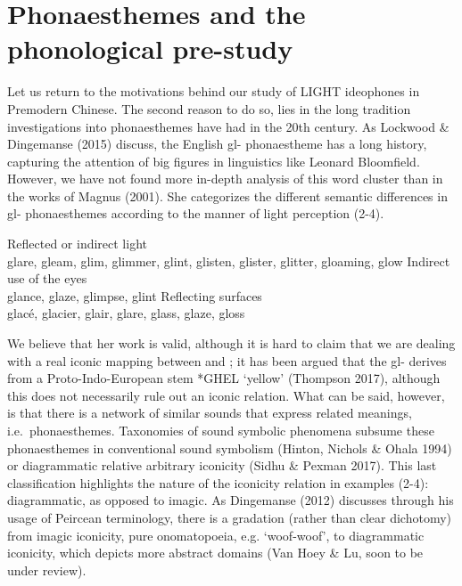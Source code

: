 \documentclass[12pt,article,oneside]{memoir}
\theoremstyle{definition}
\theoremstyle{definition}
\theoremstyle{definition}
\theoremstyle{remark}
\begin{document}
\section{Phonaesthemes and the phonological
pre-study}\label{phonaesthemes-and-the-phonological-pre-study}

Let us return to the motivations behind our study of LIGHT ideophones in
Premodern Chinese. The second reason to do so, lies in the long
tradition investigations into phonaesthemes have had in the 20th
century. As Lockwood \& Dingemanse (2015) discuss, the English gl-
phonaestheme has a long history, capturing the attention of big figures
in linguistics like Leonard Bloomfield. However, we have not found more
in-depth analysis of this word cluster than in the works of Magnus
(2001). She categorizes the different semantic differences in gl-
phonaesthemes according to the manner of light perception (2-4).

\begin{exe}
    \ex \begin{xlist}
        \ex Reflected or indirect light\\
            glare, gleam, glim, glimmer, glint, glisten, glister,               glitter, gloaming, glow
        \ex Indirect use of the eyes\\
            glance, glaze, glimpse, glint
        \ex Reflecting surfaces\\
            glacé, glacier, glair, glare, glass, glaze, gloss
        \end{xlist}
\end{exe}

We believe that her work is valid, although it is hard to claim that we
are dealing with a real iconic mapping between and ; it has been argued
that the gl- derives from a Proto-Indo-European stem *GHEL `yellow'
(Thompson 2017), although this does not necessarily rule out an iconic
relation. What can be said, however, is that there is a network of
similar sounds that express related meanings, i.e.~phonaesthemes.
Taxonomies of sound symbolic phenomena subsume these phonaesthemes in
conventional sound symbolism (Hinton, Nichols \& Ohala 1994) or
diagrammatic relative arbitrary iconicity (Sidhu \& Pexman 2017). This
last classification highlights the nature of the iconicity relation in
examples (2-4): diagrammatic, as opposed to imagic. As Dingemanse (2012)
discusses through his usage of Peircean terminology, there is a
gradation (rather than clear dichotomy) from imagic iconicity, pure
onomatopoeia, e.g. `woof-woof', to diagrammatic iconicity, which depicts
more abstract domains (Van Hoey \& Lu, soon to be under review).
\end{document}

